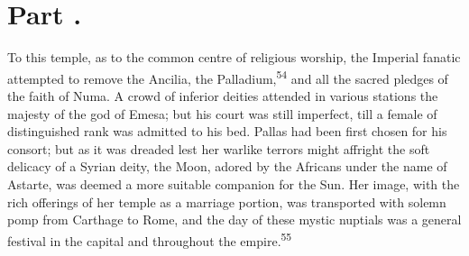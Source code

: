 
\section{Part \thesection.}

To this temple, as to the common centre of religious worship, the
Imperial fanatic attempted to remove the Ancilia, the Palladium,\textsuperscript{54}
and all the sacred pledges of the faith of Numa. A crowd of
inferior deities attended in various stations the majesty of the
god of Emesa; but his court was still imperfect, till a female of
distinguished rank was admitted to his bed. Pallas had been first
chosen for his consort; but as it was dreaded lest her warlike
terrors might affright the soft delicacy of a Syrian deity, the
Moon, adored by the Africans under the name of Astarte, was
deemed a more suitable companion for the Sun. Her image, with the
rich offerings of her temple as a marriage portion, was
transported with solemn pomp from Carthage to Rome, and the day
of these mystic nuptials was a general festival in the capital
and throughout the empire.\textsuperscript{55}



